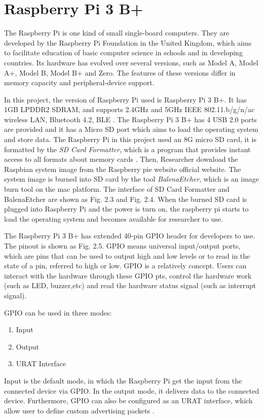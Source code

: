 \documentclass[11pt,times,oneside,openright,hardcopy]{eeereport}
\begin{document}
\section{Raspberry Pi 3 B+}
The Raspberry Pi is one kind of small single-board computers. They are developed by the Raspberry Pi Foundation in the United Kingdom, which aims to facilitate education of basic computer science in schools and in developing countries. 
Its hardware has evolved over several versions, such as Model A, Model A+, Model B, Model B+ and Zero. The features of these versions differ in memory capacity and peripheral-device support.

In this project, the version of Raspberry Pi used is Raspberry Pi 3 B+.
It has 1GB LPDDR2 SDRAM, and supports 2.4GHz and 5GHz IEEE 802.11.b/g/n/ac wireless LAN, Bluetooth 4.2, BLE \cite{Upton:2014wt}. The Raspberry Pi 3 B+ has 4 USB 2.0 ports are provided and it has a Micro SD port which aims to load the operating system and store data. 
The Raspberry Pi in this project used an 8G micro SD card, it is formatted by the \emph{SD Card Formatter}, which is a program that provides instant access to all formats about memory cards \cite{HartDavis:2016uq}.
Then, Researcher download the Raspbian system image from the Raspberry pie website official website. The system image is burned into SD card by the tool \emph{BalenaEtcher}, which is an image burn tool on the mac platform.
The interface of SD Card Formatter and BalenaEtcher are shown as Fig. 2.3 and Fig. 2.4.
When the burned SD card is plugged into Raspberry Pi and the power is turn on, the raspberry pi starts to load the operating system and becomes available for researcher to use.

The Raspberry Pi 3 B+ has extended 40-pin GPIO header for developers to use. The pinout is shown as Fig. 2.5. GPIO means universal input/output ports, which are pins that can be used to output high and low levels or to read
in the state of a pin, referred to high or low. GPIO is a relatively concept. Users can interact with the hardware through these GPIO pts, control the hardware work (such as LED, buzzer,etc) and read the hardware status
signal (such as interrupt signal).

GPIO can be used in three modes:
\begin{enumerate}
    \item Input
    \item Output
    \item URAT Interface
\end{enumerate}
Input is the default mode, in which the Raspberry Pi get the input from the connected device via GPIO. 
In the output mode, it delivers data to the connected device. Furthermore, GPIO can also be configured as an URAT interface,
which allow user to define custom advertising packets \cite{Monk:2012vo}.
\end{document}
